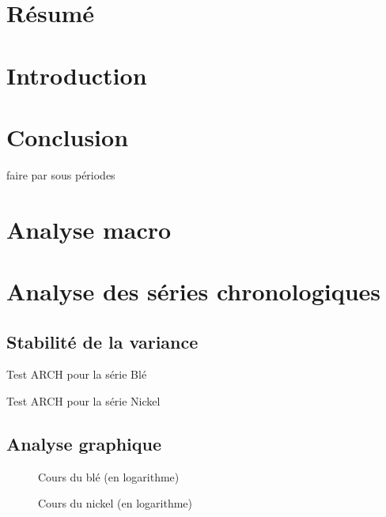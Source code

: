 \documentclass[12pt,a4paper]{article}
\begin{document}
\clearpage
{}
\pagestyle{fancy}
\fancyhead{}
\fancyfoot{}
\fancyfoot[C]{\thepage}
\section*{Résumé}
\renewcommand\contentsname{Sommaire}
\tableofcontents



\section*{Introduction}






\section*{Conclusion}


faire par sous périodes


\appendix
\renewcommand{\thetable}{\thesection.\arabic{table}}
\renewcommand{\thefigure}{\thesection.\arabic{figure}}
\section{Analyse macro}
\setcounter{table}{0}
\setcounter{figure}{0}

\section{Analyse des séries chronologiques}
\setcounter{table}{0}
\setcounter{figure}{0}
\subsection{Stabilité de la variance}\label{appendix:hetero}
\begin{table}[H]
    \centering
    \caption{Test ARCH pour la série Blé}
    \sffamily
    \label{tab:hetero_ble}
    
\end{table}

\begin{table}[H]
    \centering
    \caption{Test ARCH pour la série Nickel}
    \sffamily
    \label{tab:hetero_nickel}
    
\end{table}

\subsection{Analyse graphique}\label{appendix:loggraph}
\begin{figure}[H]
    \centering
    \label{fig:ble_log}
    \resizebox{0.8\textwidth}{!}{}
    \caption{Cours du blé (en logarithme)}
\end{figure}
\begin{figure}[H]
    \centering
    \label{fig:nickel_log}
    \resizebox{0.8\textwidth}{!}{}
    \caption{Cours du nickel (en logarithme)}
\end{figure}
\end{document}

